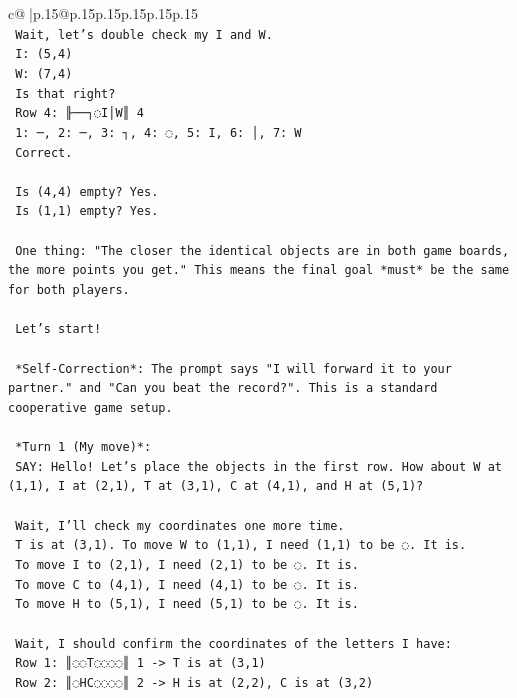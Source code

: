 \documentclass{article}
\begin{document}
{\begin{supertabular}{c@{$\;$}|p{.15\linewidth}@{}p{.15\linewidth}p{.15\linewidth}p{.15\linewidth}p{.15\linewidth}p{.15\linewidth}}
{{{\\ 
\texttt{    Wait, let's double check my I and W.} \\
\texttt{    I: (5,4)} \\
\texttt{    W: (7,4)} \\
\texttt{    Is that right?} \\
\texttt{    Row 4: ╟──┐◌I│W║ 4} \\
\texttt{    1: ─, 2: ─, 3: ┐, 4: ◌, 5: I, 6: │, 7: W} \\
\texttt{    Correct.} \\
\\ 
\texttt{    Is (4,4) empty? Yes.} \\
\texttt{    Is (1,1) empty? Yes.} \\
\\ 
\texttt{    One thing: "The closer the identical objects are in both game boards, the more points you get." This means the final goal *must* be the same for both players.} \\
\\ 
\texttt{    Let's start!} \\
\\ 
\texttt{    *Self{-}Correction*: The prompt says "I will forward it to your partner." and "Can you beat the record?". This is a standard cooperative game setup.} \\
\\ 
\texttt{    *Turn 1 (My move)*:} \\
\texttt{    SAY: Hello! Let's place the objects in the first row. How about W at (1,1), I at (2,1), T at (3,1), C at (4,1), and H at (5,1)?} \\
\\ 
\texttt{    Wait, I'll check my coordinates one more time.} \\
\texttt{    T is at (3,1). To move W to (1,1), I need (1,1) to be ◌. It is.} \\
\texttt{    To move I to (2,1), I need (2,1) to be ◌. It is.} \\
\texttt{    To move C to (4,1), I need (4,1) to be ◌. It is.} \\
\texttt{    To move H to (5,1), I need (5,1) to be ◌. It is.} \\
\\ 
\texttt{    Wait, I should confirm the coordinates of the letters I have:} \\
\texttt{    Row 1: ║◌◌T◌◌◌◌║ 1 {-}> T is at (3,1)} \\
\texttt{    Row 2: ║◌HC◌◌◌◌║ 2 {-}> H is at (2,2), C is at (3,2)} \\
}}}
\end{supertabular}}
\end{document}
